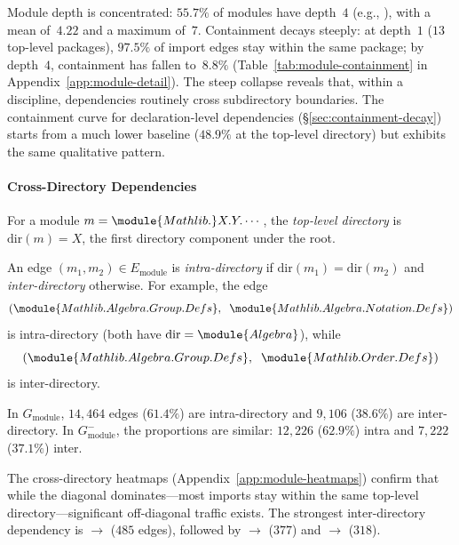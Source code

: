 Module depth is concentrated: $55.7\%$ of modules have depth~$4$ (e.g., ), with a mean of~$4.22$ and a maximum of~$7$. Containment decays steeply: at depth~$1$ ($13$ top-level packages), $97.5\%$ of import edges stay within the same package; by depth~$4$, containment has fallen to~$8.8\%$ (Table~\ref{tab:module-containment} in Appendix~\ref{app:module-detail}). The steep collapse reveals that, within a discipline, dependencies routinely cross subdirectory boundaries. The containment curve for declaration-level dependencies (\S\ref{sec:containment-decay}) starts from a much lower baseline ($48.9\%$ at the top-level directory) but exhibits the same qualitative pattern.

\paragraph{Cross-Directory Dependencies}
\label{sec:cross-namespace}

\begin{definition}
For a module $m = \module{Mathlib.}X.Y.\cdots$, the \emph{top-level directory} is $\mathrm{dir}(m) = X$, the first directory component under the  root.
\end{definition}

\begin{definition}
An edge $(m_1, m_2) \in E_{\mathrm{module}}$ is \emph{intra-directory} if $\mathrm{dir}(m_1) = \mathrm{dir}(m_2)$ and \emph{inter-directory} otherwise. For example, the edge
\[
  (\module{Mathlib.Algebra.Group.Defs},\;\; \module{Mathlib.Algebra.Notation.Defs})
\]
is intra-directory (both have $\mathrm{dir} = \module{Algebra}$), while
\[
  (\module{Mathlib.Algebra.Group.Defs},\;\; \module{Mathlib.Order.Defs})
\]
is inter-directory.
\end{definition}

\noindent
In $G_{\mathrm{module}}$, $14{,}464$ edges ($61.4\%$) are intra-directory and $9{,}106$ ($38.6\%$) are inter-directory. In $G_{\mathrm{module}}^{-}$, the proportions are similar: $12{,}226$ ($62.9\%$) intra and $7{,}222$ ($37.1\%$) inter.

The cross-directory heatmaps (Appendix~\ref{app:module-heatmaps}) confirm that while the diagonal dominates---most imports stay within the same top-level directory---significant off-diagonal traffic exists. The strongest inter-directory dependency is  $\to$  ($485$ edges), followed by  $\to$  ($377$) and  $\to$  ($318$).

